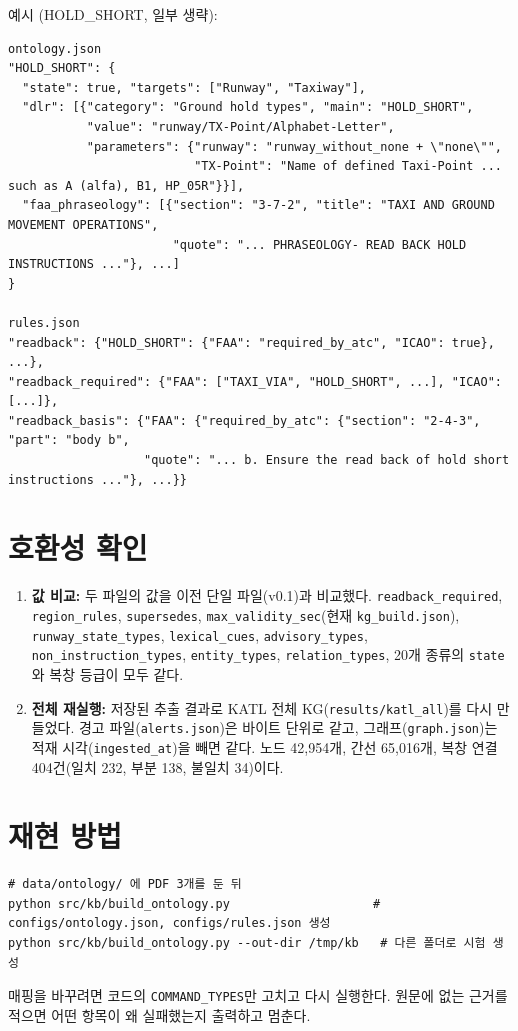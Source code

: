 \documentclass[10pt,a4paper]{article}
\newcommand{\cmd}[1]{\textsf{\small #1}}
\newcommand{\key}[1]{\texttt{\small #1}}
\begin{document}
\noindent 예시 (\cmd{HOLD\_SHORT}, 일부 생략):
{\footnotesize
\begin{verbatim}
ontology.json
"HOLD_SHORT": {
  "state": true, "targets": ["Runway", "Taxiway"],
  "dlr": [{"category": "Ground hold types", "main": "HOLD_SHORT",
           "value": "runway/TX-Point/Alphabet-Letter",
           "parameters": {"runway": "runway_without_none + \"none\"",
                          "TX-Point": "Name of defined Taxi-Point ... such as A (alfa), B1, HP_05R"}}],
  "faa_phraseology": [{"section": "3-7-2", "title": "TAXI AND GROUND MOVEMENT OPERATIONS",
                       "quote": "... PHRASEOLOGY- READ BACK HOLD INSTRUCTIONS ..."}, ...]
}

rules.json
"readback": {"HOLD_SHORT": {"FAA": "required_by_atc", "ICAO": true}, ...},
"readback_required": {"FAA": ["TAXI_VIA", "HOLD_SHORT", ...], "ICAO": [...]},
"readback_basis": {"FAA": {"required_by_atc": {"section": "2-4-3", "part": "body b",
                   "quote": "... b. Ensure the read back of hold short instructions ..."}, ...}}
\end{verbatim}
}

\section{호환성 확인}\label{sec:compat}
\begin{enumerate}[leftmargin=14pt]
\item \textbf{값 비교:} 두 파일의 값을 이전 단일 파일(v0.1)과 비교했다. \key{readback\_required}, \key{region\_rules}, \key{supersedes}, \key{max\_validity\_sec}(현재 \texttt{kg\_build.json}), \key{runway\_state\_types}, \key{lexical\_cues}, \key{advisory\_types}, \key{non\_instruction\_types}, \key{entity\_types}, \key{relation\_types}, 20개 종류의 \key{state}와 복창 등급이 모두 같다.
\item \textbf{전체 재실행:} 저장된 추출 결과로 KATL 전체 KG(\texttt{results/katl\_all})를 다시 만들었다. 경고 파일(\texttt{alerts.json})은 바이트 단위로 같고, 그래프(\texttt{graph.json})는 적재 시각(\key{ingested\_at})을 빼면 같다. 노드 42{,}954개, 간선 65{,}016개, 복창 연결 404건(일치 232, 부분 138, 불일치 34)이다.
\end{enumerate}

\section{재현 방법}
{\small
\begin{verbatim}
# data/ontology/ 에 PDF 3개를 둔 뒤
python src/kb/build_ontology.py                    # configs/ontology.json, configs/rules.json 생성
python src/kb/build_ontology.py --out-dir /tmp/kb   # 다른 폴더로 시험 생성
\end{verbatim}
}
\noindent 매핑을 바꾸려면 코드의 \key{COMMAND\_TYPES}만 고치고 다시 실행한다. 원문에 없는 근거를 적으면 어떤 항목이 왜 실패했는지 출력하고 멈춘다.
\end{document}
